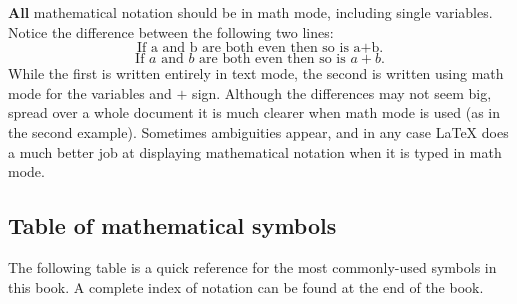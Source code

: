 \textbf{All} mathematical notation should be in math mode, including single variables. Notice the difference between the following two lines:
\[ \text{If a and b are both even then so is a+b.} \]
\[ \text{If } a \text{ and } b \text{ are both even then so is } a+b \text{.} \]
While the first is written entirely in text mode, the second is written using math mode for the variables and $+$ sign. Although the differences may not seem big, spread over a whole document it is much clearer when math mode is used (as in the second example). Sometimes ambiguities appear, and in any case \LaTeX{} does a much better job at displaying mathematical notation when it is typed in math mode.

\newpage
\subsection*{Table of mathematical symbols}

The following table is a quick reference for the most commonly-used symbols in this book. A complete index of notation can be found at the end of the book.

